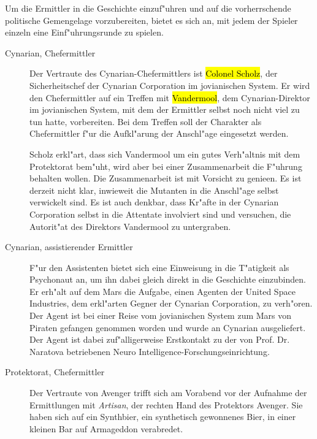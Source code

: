
Um die Ermittler in die Geschichte einzuf"uhren und auf die vorherrschende politische Gemengelage vorzubereiten, bietet es sich an, mit jedem der Spieler einzeln eine Einf"uhrungsrunde zu spielen.

\begin{description}
\item [Cynarian, Chefermittler] Der Vertraute des Cynarian-Chefermittlers ist \hl{Colonel Scholz}, der Sicherheitschef der Cynarian 	
		Corporation im jovianischen System. Er wird den Chefermittler auf ein Treffen mit \hl{Vandermool}, dem Cynarian-Direktor im jovianischen System, mit dem der Ermittler selbst noch nicht viel zu tun hatte, vorbereiten. Bei dem Treffen soll der Charakter als Chefermittler f"ur die Aufkl"arung der Anschl"age eingesetzt werden. 
		
		Scholz erkl"art, dass sich Vandermool um ein gutes Verh"altnis mit dem Protektorat bem"uht, wird aber bei einer Zusammenarbeit die F"uhrung behalten wollen. Die Zusammenarbeit ist mit Vorsicht zu genie\3en. Es ist derzeit nicht klar, inwieweit die Mutanten in die Anschl"age selbst verwickelt sind. Es ist auch denkbar, dass Kr"afte in der Cynarian Corporation selbst in die Attentate involviert sind und versuchen, die Autorit"at des Direktors Vandermool zu untergraben.
	\item [Cynarian, assistierender Ermittler] F"ur den Assistenten bietet sich eine Einweisung in die T"atigkeit als Psychonaut an, um ihn 
		dabei gleich direkt in die Geschichte einzubinden. Er erh"alt auf dem Mars die Aufgabe, einen Agenten der United Space Industries, dem erkl"arten Gegner der Cynarian Corporation, zu verh"oren. Der Agent ist bei einer Reise vom jovianischen System zum Mars von Piraten gefangen genommen worden und wurde an Cynarian ausgeliefert. Der Agent ist dabei zuf"alligerweise Erstkontakt zu der von Prof. Dr. Naratova betriebenen Neuro Intelligence-Forschungseinrichtung.
	\item [Protektorat, Chefermittler] Der Vertraute von Avenger trifft sich am Vorabend vor der Aufnahme der Ermittlungen mit 
		\emph{Artisan}, der rechten Hand des Protektors Avenger. Sie haben sich auf ein Synthbier, ein synthetisch gewonnenes Bier, in einer kleinen Bar auf Armageddon verabredet. 
		

\end{description}
